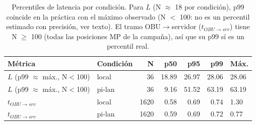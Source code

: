 \begin{table}[H]
\centering
\caption{Percentiles de latencia por condición. Para $L$ (N $\approx$ 18 por condición), p99 coincide en la práctica con el máximo observado (N $<$ 100: no es un percentil estimado con precisión, ver texto). El tramo OBU$\to$servidor ($t_{OBU\to srv}$) tiene N $\geq$ 100 (todas las posiciones MP de la campaña), así que su p99 sí es un percentil real.}
\label{tab:latencia_percentiles}
\small
\begin{tabular}{llrrrrl}
\toprule
\textbf{Métrica} & \textbf{Condición} & \textbf{N} & \textbf{p50} & \textbf{p95} & \textbf{p99} & \textbf{Máx.} \\
\midrule
$L$ (p99 $\approx$ máx., N$<$100) & local & 36 & 18.89 & 26.97 & 28.06 & 28.06 \\
$L$ (p99 $\approx$ máx., N$<$100) & pi-lan & 36 & 9.16 & 51.52 & 63.19 & 63.19 \\
$t_{OBU\to srv}$ & local & 1620 & 0.58 & 0.69 & 0.74 & 1.30 \\
$t_{OBU\to srv}$ & pi-lan & 1620 & 0.59 & 0.69 & 0.72 & 0.77 \\
\bottomrule
\end{tabular}
\end{table}
